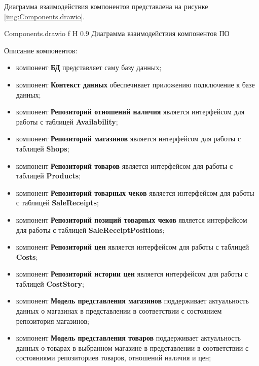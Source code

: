 \documentclass[a4paper]{bmstu}
\begin{document}
Диаграмма взаимодействия компонентов представлена на рисунке \ref{img:Components.drawio}.

	{Components.drawio}
	{f}
	{H}
	{0.9\textwidth}
	{Диаграмма взаимодействия компонентов ПО}

Описание компонентов:

\begin{itemize}
	\item компонент \textbf{БД} представляет саму базу данных;
	
	\item компонент \textbf{Контекст данных} обеспечивает приложению подключение к базе данных;
	
	\item компонент \textbf{Репозиторий отношений наличия} является интерфейсом для работы с таблицей \textbf{Availability};
	
	\item компонент \textbf{Репозиторий магазинов} является интерфейсом для работы с таблицей \textbf{Shops};
	
	\item компонент \textbf{Репозиторий товаров} является интерфейсом для работы с таблицей \textbf{Products};
	
	\item компонент \textbf{Репозиторий товарных чеков} является интерфейсом для работы с таблицей \textbf{SaleReceipts};
	
	\item компонент \textbf{Репозиторий позиций товарных чеков} является интерфейсом для работы с таблицей \textbf{SaleReceiptPositions};
	
	\item компонент \textbf{Репозиторий цен} является интерфейсом для работы с таблицей \textbf{Costs};
	
	\item компонент \textbf{Репозиторий истории цен} является интерфейсом для работы с таблицей \textbf{CostStory};
	
	\item компонент \textbf{Модель представления магазинов} поддерживает актуальность данных о магазинах в представлении в соответствии с состоянием репозитория магазинов;
	
	\item компонент \textbf{Модель представления товаров} поддерживает актуальность данных о товарах в выбранном магазине в представлении в соответствии с состояниями репозиториев товаров, отношений наличия и цен;
	

\end{itemize}
\end{document}

